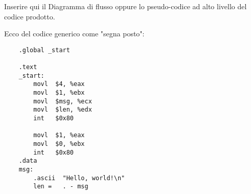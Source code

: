 \documentclass[../Relazione.tex]{subfiles}
\begin{document}
Inserire qui il Diagramma
di flusso oppure lo pseudo-codice ad alto livello
del codice prodotto.

Ecco del codice generico come "segna posto":

\begin{verbatim}
    .global _start

    .text
    _start:
        movl  $4, %eax
        movl  $1, %ebx
        movl  $msg, %ecx
        movl  $len, %edx
        int   $0x80
    
        movl  $1, %eax
        movl  $0, %ebx
        int   $0x80
    .data
    msg:
        .ascii  "Hello, world!\n"
        len =   . - msg   
\end{verbatim}
\end{document}
